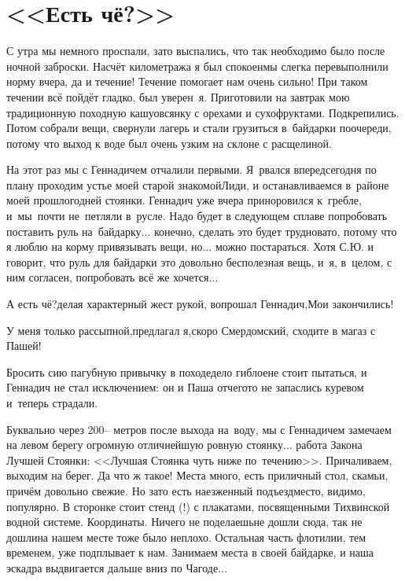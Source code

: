 \chapter{<<Есть чё?>>} 
\vepsianrose

С утра мы немного проспали, зато выспались, что так необходимо было после ночной заброски. Насчёт километража я был спокоен\mdash мы слегка перевыполнили норму вчера, да и течение! Течение помогает нам очень сильно! При таком течении всё пойдёт гладко, был уверен~я. Приготовили на завтрак мою традиционную походную кашу\mdash овсянку с орехами и сухофруктами. Подкрепились. Потом собрали вещи, свернули лагерь и стали грузиться в~байдарки по\sdash очереди, потому что выход к воде был очень узким на склоне с расщелиной. 

На этот раз мы с Геннадичем отчалили первыми. Я~рвался вперед\mdash  сегодня по плану проходим устье моей старой знакомой\mdash  Лиди, и останавливаемся в~районе моей прошлогодней стоянки. Геннадич уже вчера приноровился к~гребле, и~мы~почти не~петляли в~русле. Надо будет в следующем сплаве попробовать поставить руль на~байдарку$\ldots$ конечно, сделать это будет трудновато, потому что я люблю на корму привязывать вещи, но$\ldots$ можно постараться. Хотя С.Ю. и говорит, что руль для байдарки это довольно бесполезная вещь, и~я, в~целом, с ним согласен, попробовать всё же хочется$\ldots$ 

\diagdash А есть чё?\mdash делая характерный жест рукой, вопрошал Геннадич,\mdash Мои закончились!

\diagdash У меня только рассыпной,\mdash предлагал я,\mdash скоро Смердомский, сходите в магаз с Пашей!

Бросить сию пагубную привычку в походе\mdash дело гиблое\mdash не стоит пытаться, и Геннадич не стал исключением: он и Паша отчего\sdash то не запаслись куревом и~теперь страдали.

Буквально через 200\thinspace\nobreakdash-- метров после выхода на~воду, мы с Геннадичем замечаем на левом берегу огромную отличнейшую ровную стоянку$\ldots$  работа Закона Лучшей Стоянки: <<Лучшая Стоянка чуть ниже по~течению>>. Причаливаем, выходим на берег. Да что ж такое! Места много, есть приличный стол, скамьи, причём довольно свежие. Но зато есть наезженный подъезд\mdash  место, видимо, популярно. В сторонке стоит стенд (!) с плакатами, посвященными Тихвинской водной системе. Координаты\mdash \CoordsChagodaGood. Ничего не поделаешь\mdash не дошли сюда, так не дошли\mdash на нашем месте тоже было неплохо. Остальная часть флотилии, тем временем, уже подплывает к нам. Занимаем места в своей байдарке, и наша эскадра выдвигается дальше вниз по Чагоде$\ldots$  

